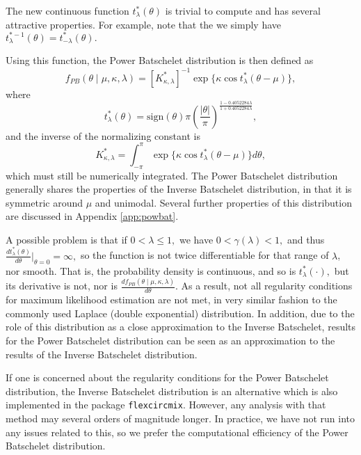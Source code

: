 The new continuous function \( t_{\lambda}^\ast(\theta) \) is trivial to compute and has several attractive properties. For example, note that the we simply have \(t_{\lambda}^{\ast-1}(\theta)= t_{-\lambda}^\ast(\theta).\)

Using this function, the Power Batschelet distribution is then defined as
\begin{equation} \label{eqn:powbatpdf}
 f_{PB}(\theta \mid \mu, \kappa, \lambda) = [K^\ast_{\kappa, \lambda}]^{-1} \exp\{\kappa \cos t^\ast_\lambda(\theta - \mu)\},
\end{equation}
where
\begin{equation}
  t_{\lambda}^\ast(\theta) = \text{sign}(\theta)\pi \left( \frac{\vert\theta\vert}{\pi} \right)^{ \frac{1 - 0.4052284\lambda}{1 + 0.4052284\lambda}},
\end{equation}
and the inverse of the normalizing constant is
\begin{equation}
   K^\ast_{\kappa, \lambda} = \int_{-\pi}^\pi \exp\{\kappa \cos t^\ast_\lambda(\theta - \mu)\} d\theta,
\end{equation}
which must still be numerically integrated. The Power Batschelet distribution generally shares the properties of the Inverse Batschelet distribution, in that it is symmetric around \(\mu\) and unimodal. Several further properties of this distribution are discussed in Appendix \ref{app:powbat}.

A possible problem is that if \(0 < \lambda \leq 1,\) we have \(0 < \gamma(\lambda) < 1,\) and thus \(\frac{d t^\ast_{\lambda}(\theta)}{d\theta}\Bigr|_{\theta = 0} = \infty,\) so the function is not twice differentiable for that range of \(\lambda\), nor smooth. That is, the probability density is continuous, and so is $t^\ast_\lambda(\cdot),$ but its derivative is not, nor is \( \frac{d f_{PB}(\theta \mid \mu, \kappa, \lambda)}{d\theta}.\) As a result, not all regularity conditions for maximum likelihood estimation are not met, in very similar fashion to the commonly used Laplace (double exponential) distribution. In addition, due to the role of this distribution as a close approximation to the Inverse Batschelet, results for the Power Batschelet distribution can be seen as an approximation to the results of the Inverse Batschelet distribution.

If one is concerned about the regularity conditions for the Power Batschelet distribution, the Inverse Batschelet distribution is an alternative which is also implemented in the package \texttt{flexcircmix}. However, any analysis with that method may several orders of magnitude longer. In practice, we have not run into any issues related to this, so we prefer the computational efficiency of the Power Batschelet distribution.

